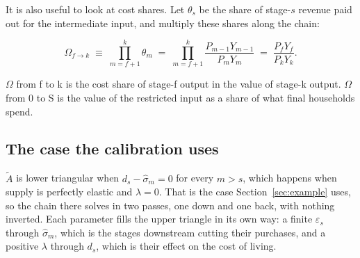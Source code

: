 \documentclass[11pt,a4paper]{article}
\begin{document}
It is also useful to look at cost shares. Let $\theta_s$ be the share of stage-$s$ revenue paid out for the intermediate input, and multiply these shares along the chain:

\begin{equation}
\Omega_{f \to k} \;\equiv\; \prod_{m=f+1}^{k} \theta_m
\;=\; \prod_{m=f+1}^{k} \frac{P_{m-1}Y_{m-1}}{P_m Y_m}
\;=\; \frac{P_f Y_f}{P_k Y_k} .
\end{equation}

$\Omega$ from f to k is the cost share of stage-f output in the value of stage-k output. $\Omega$ from 0 to S is the value of the restricted input as a share of what final households spend.


\subsection{The case the calibration uses}
\label{sec:special}


$\tilde A$ is lower triangular when $d_s - \hat\sigma_m = 0$ for every $m > s$, which happens when supply is perfectly elastic and $\lambda = 0$. That is the case Section~\ref{sec:example} uses, so the chain there solves in two passes, one down and one back, with nothing inverted. Each parameter fills the upper triangle in its own way: a finite $\varepsilon_s$ through $\hat\sigma_m$, which is the stages downstream cutting their purchases, and a positive $\lambda$ through $d_s$, which is their effect on the cost of living.
\end{document}

